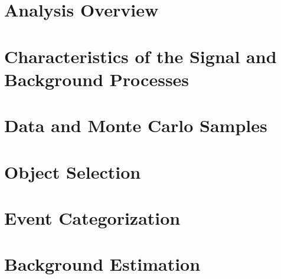 

\section{Analysis Overview}
\label{sec:analysis-overview}


\section{Characteristics of the Signal and Background Processes}
\label{sec:signal-bkg-characteristics}



\section{Data and Monte Carlo Samples}
\label{sec:data-mc-samples}



\section{Object Selection}
\label{sec:object-selection}



\section{Event Categorization}
\label{sec:event-categorization}



\section{Background Estimation}
\label{sec:bkg-estimation}


